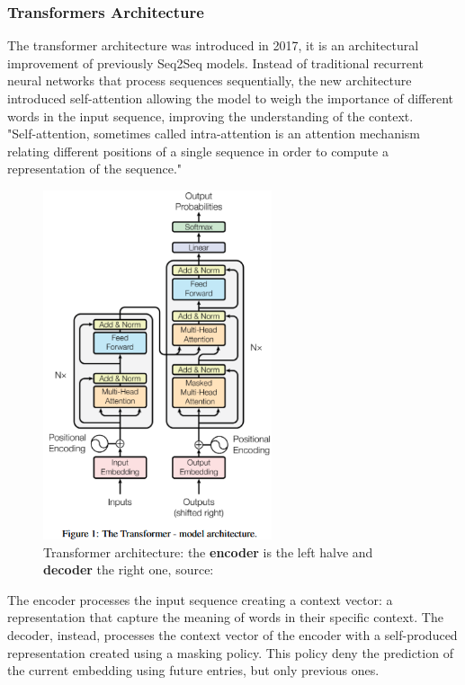 \documentclass[12pt]{article}
\begin{document}
        \subsubsection{Transformers Architecture}
The transformer architecture was introduced in 2017, it is an architectural improvement of previously Seq2Seq models. Instead of traditional recurrent neural networks that process sequences sequentially, the new architecture introduced self-attention allowing the model to weigh the importance of different words in the input sequence, improving the understanding of the context.\\
"Self-attention, sometimes called intra-attention is an attention mechanism relating different positions
of a single sequence in order to compute a representation of the sequence."\cite{vaswani2023attentionneed}\\
	\begin{figure}[H]
    \centering
            \includegraphics[width=0.6\textwidth]{transformer.png}
    \caption{Transformer architecture: the \textbf{encoder} is the left halve and \textbf{decoder} the right one, source: \cite{vaswani2023attentionneed}}
    \end{figure}
The encoder processes the input sequence creating a context vector: a representation that capture the meaning of words in their specific context. The decoder, instead, processes the context vector of the encoder with a self-produced representation created using a masking policy. This policy deny the prediction of the current embedding using future entries, but only previous ones.
\end{document}
